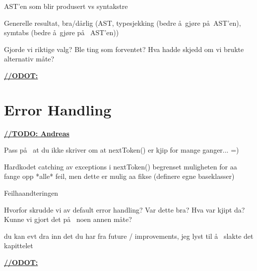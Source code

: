 AST'en som blir produsert vs syntakstre

Generelle resultat, bra/d\aa rlig (AST, typesjekking (bedre \aa~gj\o re p\aa~AST'en),
symtabs (bedre \aa~gj\o re p\aa~ AST'en))

Gjorde vi riktige valg? Ble ting som forventet? Hva hadde skjedd om vi brukte alternativ m\aa te? 

\underline{\textbf{\LARGE //ODOT:}}

\section{Error Handling}
\underline{\textbf{\LARGE //TODO: Andreas}}

Pass p\aa~ at du ikke skriver om at nextToken() er kjip for mange ganger... =)

Hardkodet catching av exceptions i nextToken() begrenset muligheten for aa
fange opp *alle* feil, men dette er mulig aa fikse (definere egne baseklasser)

Feilhaandteringen

Hvorfor skrudde vi av default error handling? Var dette bra? Hva var kjipt da? Kunne vi gjort det p\aa~ noen annen m\aa te?

du kan evt dra inn det du har fra future / improvements, jeg lyst til \aa~ slakte det kapittelet

\underline{\textbf{\LARGE //ODOT:}}





